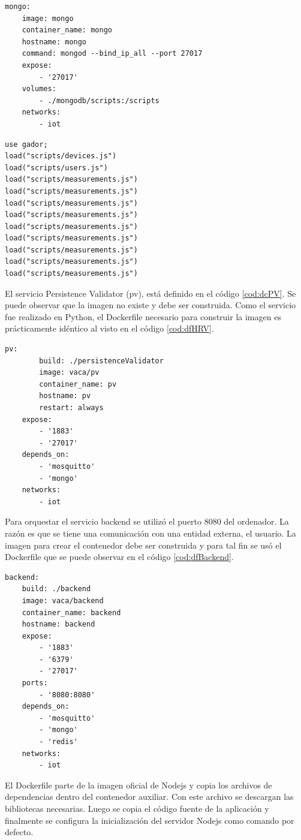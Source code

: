 \begin{lstlisting}[label=cod:dcMongo,caption=Orquestación de MongoDB.]
mongo:
	image: mongo
	container_name: mongo
	hostname: mongo
	command: mongod --bind_ip_all --port 27017
	expose: 
		- '27017'
	volumes: 
		- ./mongodb/scripts:/scripts
	networks:
		- iot
\end{lstlisting}

\begin{lstlisting}[label=cod:dcSeed,caption=Seed de la base de datos.]
use gador;
load("scripts/devices.js")
load("scripts/users.js")
load("scripts/measurements.js")
load("scripts/measurements.js")
load("scripts/measurements.js")
load("scripts/measurements.js")
load("scripts/measurements.js")
load("scripts/measurements.js")
load("scripts/measurements.js")
load("scripts/measurements.js")
load("scripts/measurements.js")
\end{lstlisting}

El servicio Persistence Validator (pv), está definido en el código \ref{cod:dcPV}.
Se puede observar que la imagen no existe y debe ser construida.
Como el servicio fue realizado en Python, el Dockerfile necesario para construir la imagen es prácticamente idéntico al visto en el código \ref{cod:dfHRV}.

\begin{lstlisting}[label=cod:dcPV,caption=Orquestación del servicio pv.]
	pv:
		build: ./persistenceValidator
		image: vaca/pv
		container_name: pv
		hostname: pv
		restart: always
	expose: 
		- '1883'
		- '27017'
	depends_on: 
		- 'mosquitto'
		- 'mongo'
	networks: 
		- iot
\end{lstlisting}

Para orquestar el servicio backend se utilizó el puerto 8080 del ordenador.
La razón es que se tiene una comunicación con una entidad externa, el usuario.
La imagen para crear el contenedor debe ser construida y para tal fin se usó el Dockerfile que se puede observar en el código \ref{cod:dfBackend}.

\begin{lstlisting}[label=cod:dcBackend,caption=Orquestación del servicio Backend.]
backend:
	build: ./backend
	image: vaca/backend
	container_name: backend
	hostname: backend
	expose: 
		- '1883'
		- '6379'
		- '27017'
	ports: 
		- '8080:8080'
	depends_on:
		- 'mosquitto' 
		- 'mongo'
		- 'redis'
	networks: 
		- iot
\end{lstlisting}

El Dockerfile parte de la imagen oficial de Nodejs y copia los archivos de dependencias dentro del contenedor auxiliar.
Con este archivo se descargan las bibliotecas necesarias.
Luego se copia el código fuente de la aplicación y finalmente se configura la inicialización del servidor Nodejs como comando por defecto.

